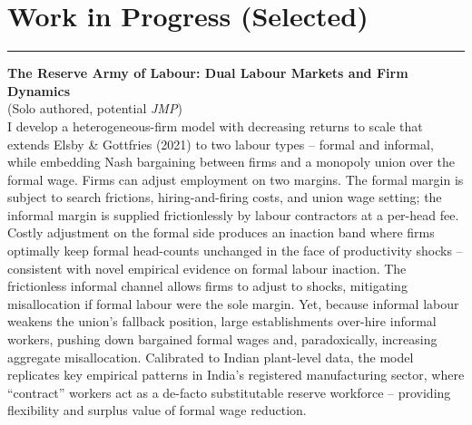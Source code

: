 \documentclass[11pt,a4paper]{article}
\begin{document}
\section*{Work in Progress (Selected)}
\vspace{-0.5em}
\hrule
\vspace{0.5em}
\textbf{The Reserve Army of Labour: Dual Labour Markets and Firm Dynamics}
\vspace{0.1cm}\\
(Solo authored, potential \textit{JMP})
\vspace{0.1cm}\\
I develop a heterogeneous-firm model with decreasing returns to scale that extends Elsby \& Gottfries (2021) to two labour types -- formal and informal, while embedding Nash bargaining between firms and a monopoly union over the formal wage. Firms can adjust employment on two margins. The formal margin is subject to search frictions, hiring-and-firing costs, and union wage setting; the informal margin is supplied frictionlessly by labour contractors at a per-head fee. Costly adjustment on the formal side produces an inaction band where firms optimally keep formal head-counts unchanged in the face of productivity shocks -- consistent with novel empirical evidence on formal labour inaction. The frictionless informal channel allows firms to adjust to shocks, mitigating misallocation if formal labour were the sole margin. Yet, because informal labour weakens the union’s fallback position, large establishments over-hire informal workers, pushing down bargained formal wages and, paradoxically, increasing aggregate misallocation. Calibrated to Indian plant-level data, the model replicates key empirical patterns in India’s registered manufacturing sector, where “contract” workers act as a de-facto substitutable reserve workforce -- providing flexibility and surplus value of formal wage reduction.

\pagebreak
\end{document}
